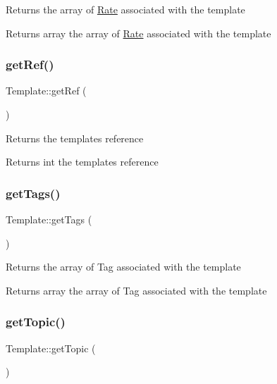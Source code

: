 Returns the array of \hyperlink{classRate}{Rate} associated with the template \begin{DoxyReturn}{Returns}
array the array of \hyperlink{classRate}{Rate} associated with the template 
\end{DoxyReturn}
\mbox{\label{classTemplate_a1fdb7061dff51456ac03a6b8224d0e5f}} 
\subsubsection{\texorpdfstring{get\+Ref()}{getRef()}}
{\footnotesize\ttfamily Template\+::get\+Ref (\begin{DoxyParamCaption}{ }\end{DoxyParamCaption})}

Returns the template\textquotesingle{}s reference \begin{DoxyReturn}{Returns}
int the template\textquotesingle{}s reference 
\end{DoxyReturn}
\mbox{\label{classTemplate_a1b12802a05fe6b9a1d81f27d2a25ad31}} 
\subsubsection{\texorpdfstring{get\+Tags()}{getTags()}}
{\footnotesize\ttfamily Template\+::get\+Tags (\begin{DoxyParamCaption}{ }\end{DoxyParamCaption})}

Returns the array of Tag associated with the template \begin{DoxyReturn}{Returns}
array the array of Tag associated with the template 
\end{DoxyReturn}
\mbox{\label{classTemplate_ac68df90a372cdbc75822229257218516}} 
\subsubsection{\texorpdfstring{get\+Topic()}{getTopic()}}
{\footnotesize\ttfamily Template\+::get\+Topic (\begin{DoxyParamCaption}{ }\end{DoxyParamCaption})}

